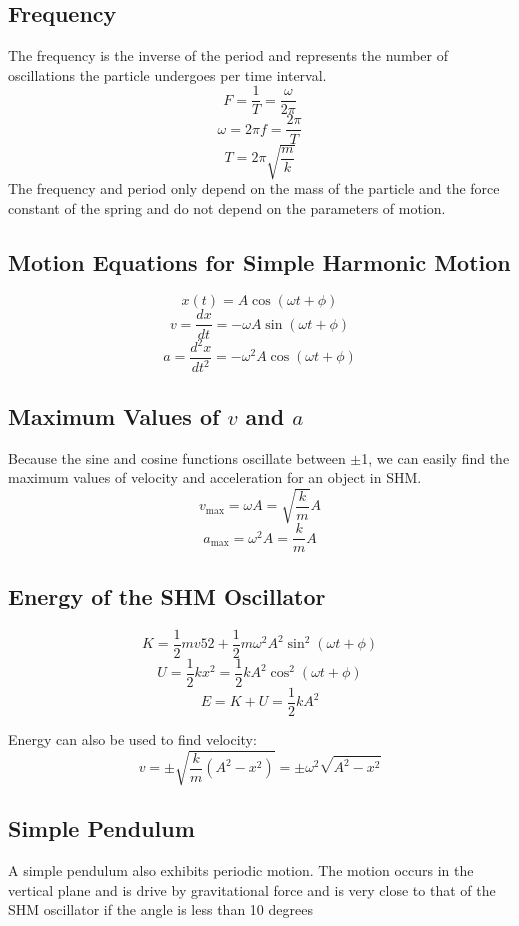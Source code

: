 \subsection{Frequency}
The frequency is the inverse of the period and represents the number of oscillations the particle undergoes per time interval.
\[F=\frac{1}{T}=\frac{\omega}{2\pi}\]
\[\omega=2\pi f=\frac{2\pi}{T}\]
\[T=2\pi\sqrt{\frac{m}{k}}\]
The frequency and period only depend on the mass of the particle and the force constant of the spring and do not depend on the parameters of motion.

\subsection{Motion Equations for Simple Harmonic Motion}
\[x(t)=A\cos (\omega t+\phi)\]
\[v=\frac{dx}{dt}=-\omega A\sin (\omega t + \phi)\]
\[a=\frac{d^2x}{dt^2}=-\omega^2A\cos (\omega t+\phi)\]

\subsection{Maximum Values of $v$ and $a$}
Because the sine and cosine functions oscillate between $\pm$1, we can easily find the maximum values of velocity and acceleration for an object in SHM.
\[v_{\text{max}}=\omega A=\sqrt{\frac{k}{m}}A\]
\[a_{\text{max}}=\omega^2A=\frac{k}{m}A\]

\subsection{Energy of the SHM Oscillator}
\[K=\frac{1}{2}mv52+\frac{1}{2}m\omega^2A^2\sin^2(\omega t +\phi)\]
\[U=\frac{1}{2}kx^2=\frac{1}{2}kA^2\cos^2(\omega t+\phi)\]
\[E=K+U=\frac{1}{2}kA^2\]

Energy can also be used to find velocity: 
\[v=\pm \sqrt{\frac{k}{m}(A^2-x^2)}=\pm \omega^2\sqrt{A^2-x^2}\]

\subsection{Simple Pendulum}
A simple pendulum also exhibits periodic motion. The motion occurs in the vertical plane and is drive by gravitational force and is very close to that of the SHM oscillator if the angle is less than 10 degrees\\

